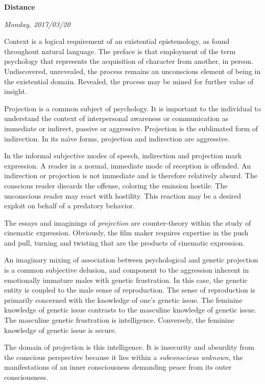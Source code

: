 

\centerline{\bf Distance}
\centerline{\it Monday, 2017/03/20}



\vfill
\break

Context is a logical requirement of an existential epistemology, as
found throughout natural language.  The preface is that employment of
the term psychology that represents the acquisition of character from
another, in person.  Undiscovered, unrevealed, the process remains an
unconscious element of being in the existential domain.  Revealed, the
process may be mined for further value of insight.

Projection is a common subject of psychology.  It is important to the
individual to understand the context of interpersonal awareness or
communication as immediate or indirect, passive or aggressive.
Projection is the sublimated form of indirection.  In its na\"{\i}ve
forms, projection and indirection are aggressive.  

In the informal subjective modes of speech, indirection and projection
mark expression.  A reader in a normal, immediate mode of reception is
offended.  An indirection or projection is not immediate and is
therefore relatively absurd.  The conscious reader discards the
offense, coloring the emission hostile.  The unconscious reader may
react with hostility.  This reaction may be a desired exploit on
behalf of a predatory behavior.

The essays and imaginings of {\it projection} are counter-theory
within the study of cinematic expression.  Obviously, the film maker
requires expertise in the push and pull, turning and twisting that are
the products of cinematic expression.

An imaginary mixing of association between psychological and genetic
projection is a common subjective delusion, and component to the
aggression inherent in emotionally immature males with genetic
frustration.  In this case, the genetic entity is coupled to the male
sense of reproduction.  The sense of reproduction is primarily
concerned with the knowledge of one's genetic issue.  The feminine
knowledge of genetic issue contrasts to the masculine knowledge of
genetic issue.  The masculine genetic frustration is intelligence.
Conversely, the feminine knowledge of genetic issue is secure.

The domain of projection is this intelligence.  It is insecurity and
absurdity from the conscious perspective because it lies within a {\it
subconscious unknown}, the manifestations of an inner consciousness
demanding peace from its outer consciousness.  


